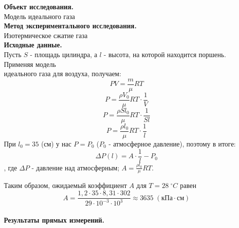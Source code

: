 \documentclass[a4paper]{article}
\begin{document}
{\parindent=0pt\textbf{Объект исследования.}}\\
Модель идеального газа\\

{\parindent=0pt\textbf{Метод экспериментального исследования.}}\\
Изотермическое сжатие газа\\



	{\parindent=0pt\textbf{Исходные данные.}}\\
	Пусть $S$ - площадь цилиндра, а $l$ - высота, на которой находится поршень. Применяя модель\\ идеального газа для воздуха, получаем:
	$$ PV=\frac{m}{\mu} RT$$
	$$ P=\frac{\rho V_0}{\mu}RT\cdot\frac{1}{V}$$
	$$ P=\frac{\rho S l_0}{\mu}RT\cdot\frac{1}{S l}$$
	$$ P=\frac{\rho  l_0}{\mu}RT\cdot\frac{1}{ l}$$
	При $l_0=35$ (см) у нас $P=P_0$ ($P_0$ - атмосферное давление), поэтому в итоге:
	$$\Delta P(l)=A\cdot \frac{1}{l} - P_0$$
	, где $\Delta P$ - давление над атмосферным; $A = \frac{\rho  l_0}{\mu}RT$.\\
	\parindent=0pt
	
	Таким образом, ожидаемый коэффициент $A$ для $T=28\;^\circ C$ равен
	$$ A=\frac{1,2\cdot35\cdot8,31\cdot302}{29\cdot10^{-3}\cdot10^3}\approx3635\;\left( \mbox{кПа}\cdot\mbox{см}\right) $$\\
	
		\newpage
	{\parindent=0pt\textbf{Результаты прямых измерений.}}\\
	
\end{document}
